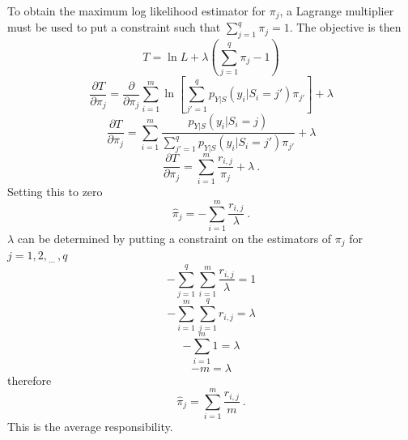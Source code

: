 \documentclass[12pt]{report}
\newcommand{\dotdotdot}{_{\phantom{.}\cdots}}
\begin{document}
To obtain the maximum log likelihood estimator for $\pi_j$, a Lagrange multiplier must be used to put a constraint such that $\sum_{j=1}^q\pi_j=1$. The objective is then
\begin{equation*}
T = \ln{L} + \lambda\left(\sum_{j=1}^q\pi_j-1\right)
\end{equation*}
\begin{equation*}
\frac{\partial T}{\partial\pi_j}=\frac{\partial}{\partial\pi_j}\sum_{i=1}^m\ln\left[
\sum_{j'=1}^qp_{Y|S}\left(y_i|S_i=j'\right)\pi_{j'}
\right] + \lambda
\end{equation*}
\begin{equation*}
\frac{\partial T}{\partial\pi_j}=\sum_{i=1}^m\frac{p_{Y|S}\left(y_i|S_i=j\right)}{\sum_{j'=1}^qp_{Y|S}\left(y_i|S_i=j'\right)\pi_{j'}} + \lambda
\end{equation*}
\begin{equation}
\frac{\partial T}{\partial\pi_j}=\sum_{i=1}^m\frac{r_{i,j}}{\pi_j} + \lambda \ .
\end{equation}
Setting this to zero
\begin{equation}
\widehat{\pi}_j = -\sum_{i=1}^m\frac{r_{i,j}}{\lambda} \ .
\end{equation}
$\lambda$ can be determined by putting a constraint on the estimators of $\pi_j$ for $j=1,2,\dotdotdot,q$
\begin{equation*}
-\sum_{j=1}^q\sum_{i=1}^m\frac{r_{i,j}}{\lambda}=1
\end{equation*}
\begin{equation*}
-\sum_{i=1}^m\sum_{j=1}^qr_{i,j}=\lambda
\end{equation*}
\begin{equation*}
-\sum_{i=1}^m1=\lambda
\end{equation*}
\begin{equation}
-m=\lambda
\end{equation}
therefore
\begin{equation}
\widehat{\pi}_j = \sum_{i=1}^m\frac{r_{i,j}}{m} \ .
\end{equation}
This is the average responsibility.
\end{document}
